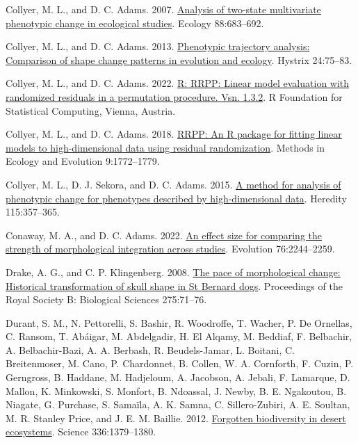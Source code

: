 \documentclass[
  11pt,
]{article}
\newlength{\cslhangindent}
\newlength{\cslentryspacingunit} %
\newenvironment{CSLReferences}[2] %
 {%
  \setlength{\parindent}{0pt}
  \ifodd #1
  \let\oldpar\par
  \def\par{\hangindent=\cslhangindent\oldpar}
  \fi
  \setlength{\parskip}{#2\cslentryspacingunit}
 }%
 {}
\begin{document}
\begin{CSLReferences}{1}{0}
\leavevmode{}%
Collyer, M. L., and D. C. Adams. 2007.
\href{https://doi.org/10.1890/06-0727}{Analysis of two-state
multivariate phenotypic change in ecological studies}. Ecology
88:683--692.

\leavevmode{}%
Collyer, M. L., and D. C. Adams. 2013.
\href{https://doi.org/10.4404/hystrix-24.1-6298}{Phenotypic trajectory
analysis: Comparison of shape change patterns in evolution and ecology}.
Hystrix 24:75--83.

\leavevmode{}%
Collyer, M. L., and D. C. Adams. 2022.
\href{https://CRAN.R-project.org/package=RRPP}{R: RRPP: Linear model
evaluation with randomized residuals in a permutation procedure. Vsn.
1.3.2}. R Foundation for Statistical Computing, Vienna, Austria.

\leavevmode{}%
Collyer, M. L., and D. C. Adams. 2018.
\href{https://doi.org/10.1111/2041-210X.13029}{RRPP: An {R} package for
fitting linear models to high-dimensional data using residual
randomization}. Methods in Ecology and Evolution 9:1772--1779.

\leavevmode{}%
Collyer, M. L., D. J. Sekora, and D. C. Adams. 2015.
\href{https://doi.org/10.1038/hdy.2014.75}{A method for analysis of
phenotypic change for phenotypes described by high-dimensional data}.
Heredity 115:357--365.

\leavevmode{}%
Conaway, M. A., and D. C. Adams. 2022.
\href{https://doi.org/10.1111/evo.14595}{An effect size for comparing
the strength of morphological integration across studies}. Evolution
76:2244--2259.

\leavevmode{}%
Drake, A. G., and C. P. Klingenberg. 2008.
\href{https://doi.org/10.1098/rspb.2007.1169}{The pace of morphological
change: Historical transformation of skull shape in {S}t {B}ernard
dogs}. Proceedings of the Royal Society B: Biological Sciences
275:71--76.

\leavevmode{}%
Durant, S. M., N. Pettorelli, S. Bashir, R. Woodroffe, T. Wacher, P. De
Ornellas, C. Ransom, T. Abáigar, M. Abdelgadir, H. El Alqamy, M.
Beddiaf, F. Belbachir, A. Belbachir-Bazi, A. A. Berbash, R.
Beudels-Jamar, L. Boitani, C. Breitenmoser, M. Cano, P. Chardonnet, B.
Collen, W. A. Cornforth, F. Cuzin, P. Gerngross, B. Haddane, M.
Hadjeloum, A. Jacobson, A. Jebali, F. Lamarque, D. Mallon, K. Minkowski,
S. Monfort, B. Ndoassal, J. Newby, B. E. Ngakoutou, B. Niagate, G.
Purchase, S. Samaïla, A. K. Samna, C. Sillero-Zubiri, A. E. Soultan, M.
R. Stanley Price, and J. E. M. Baillie. 2012.
\href{https://doi.org/10.1126/science.336.6087.1379}{Forgotten
biodiversity in desert ecosystems}. Science 336:1379--1380.


\end{CSLReferences}
\end{document}
